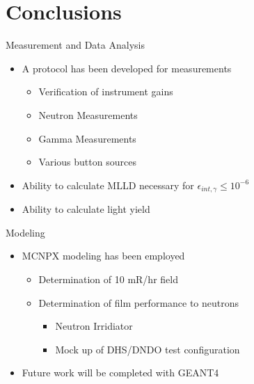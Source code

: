 \documentclass[compress]{beamer}
\begin{document}
\section*{Conclusions}
\begin{frame}{Measurement and Data Analysis}
	\begin{itemize}
		\item A protocol has been developed for measurements
		\begin{itemize}
			\item Verification of instrument gains
			\item Neutron Measurements
			\item Gamma Measurements
			\item Various button sources
		\end{itemize}
		\item Ability to calculate MLLD necessary for $\epsilon_{int,\gamma} \le 10^{-6}$
		\item Ability to calculate light yield
	\end{itemize}
\end{frame}
\begin{frame}{Modeling}
	\begin{itemize}
		\item MCNPX modeling has been employed
		\begin{itemize}
			\item Determination of 10 mR/hr field
			\item Determination of film performance to neutrons
			\begin{itemize}
				\item Neutron Irridiator
				\item Mock up of DHS/DNDO test configuration
			\end{itemize}
		\end{itemize}
		\item Future work will be completed with GEANT4
	\end{itemize}
\end{frame}
\end{document}
